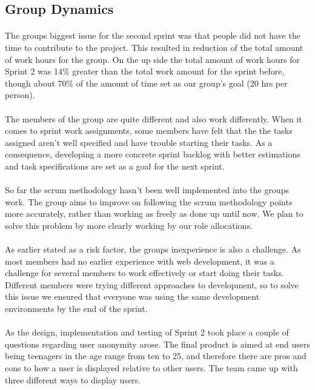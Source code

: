 \subsection{Group Dynamics}

\paragraph{} The groups biggest issue for the second sprint was that people did not have the time to contribute to the project. This resulted in reduction of the total amount of work hours for the group. On the up side the total amount of work hours for Sprint 2 was 14\% greater than the total work amount for the sprint before, though about 70\% of the amount of time set as our group’s goal (20 hrs per person). 

\paragraph{} The members of the group are quite different and also work differently. When it comes to sprint work assignments, some members have felt that the the tasks assigned aren’t well specified and have trouble starting their tasks. As a consequence, developing a more concrete sprint backlog with better estimations and task specifications are set as a goal for the next sprint. 

\paragraph{} So far the scrum methodology hasn’t been well implemented into the groups work. The group aims to improve on following the scrum methodology points more accurately, rather than working as freely as done up until now. We plan to solve this problem by more clearly working by our role allocations. 

\paragraph{} As earlier stated as a risk factor, the groups inexperience is also a challenge. As most members had no earlier experience with web development, it was a challenge for several members to work effectively or start doing their tasks. Different members were trying different approaches to development, so to solve this issue we ensured that everyone was using the same development environments by the end of the sprint. 

\paragraph{} As the design, implementation and testing of Sprint 2 took place a couple of questions regarding user anonymity arose. The final product is aimed at end users being teenagers in the age range from ten to 25, and therefore there are pros and cons to how a user is displayed relative to other users. The team came up with three different ways to display users. 

